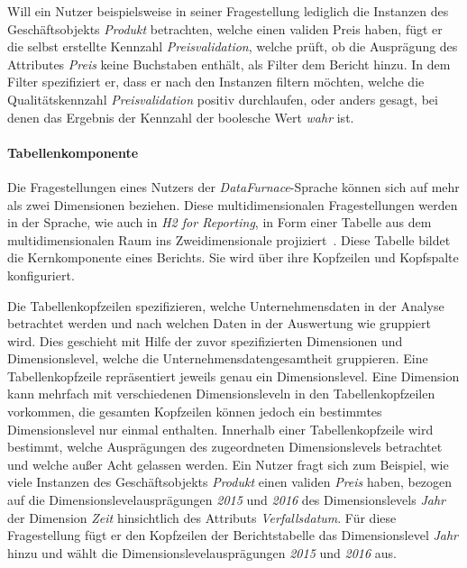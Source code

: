 \documentclass[
  language=german, %
  type=bachelor,%
  ngerman
]{isthesis}
\begin{document}
\begin{content}
  Will ein Nutzer beispielsweise in seiner Fragestellung lediglich die
  Instanzen des Geschäftsobjekts \textit{Produkt} betrachten, welche einen
  validen Preis haben, fügt er die selbst erstellte Kennzahl
  \textit{Preisvalidation}, welche prüft, ob die Ausprägung des Attributes
  \textit{Preis} keine Buchstaben enthält, als Filter dem Bericht hinzu. In dem
  Filter spezifiziert er, dass er nach den Instanzen filtern möchten, welche
  die Qualitätskennzahl \textit{Preisvalidation} positiv durchlaufen, oder
  anders gesagt, bei denen das Ergebnis der Kennzahl der boolesche Wert
  \textit{wahr} ist.

  \paragraph{Tabellenkomponente}\label{paragraph:tabellenkomponente} 
  Die Fragestellungen eines Nutzers der \textit{DataFurnace}-Sprache können
  sich auf mehr als zwei Dimensionen beziehen. Diese multidimensionalen
  Fragestellungen werden in der Sprache, wie auch in \textit{H2 for Reporting},
  in Form einer Tabelle aus dem multidimensionalen Raum ins Zweidimensionale
  projiziert~\cite[][S.  23]{becker2007h2}. Diese Tabelle bildet die
  Kernkomponente eines Berichts.  Sie wird über ihre Kopfzeilen und Kopfspalte
  konfiguriert.

  Die Tabellenkopfzeilen spezifizieren, welche Unternehmensdaten in der Analyse
  betrachtet werden und nach welchen Daten in der Auswertung wie gruppiert wird. Dies
  geschieht mit Hilfe der zuvor spezifizierten Dimensionen und Dimensionslevel,
  welche die Unternehmensdatengesamtheit gruppieren. Eine Tabellenkopfzeile
  repräsentiert jeweils genau ein Dimensionslevel. Eine Dimension kann mehrfach
  mit verschiedenen Dimensionsleveln in den Tabellenkopfzeilen vorkommen, die gesamten
  Kopfzeilen können jedoch ein bestimmtes Dimensionslevel nur einmal enthalten.
  Innerhalb einer Tabellenkopfzeile wird bestimmt, welche Ausprägungen des
  zugeordneten Dimensionslevels betrachtet und welche außer Acht gelassen
  werden. Ein Nutzer fragt sich zum Beispiel, wie viele Instanzen des
  Geschäftsobjekts \textit{Produkt} einen validen \textit{Preis} haben, bezogen
  auf die Dimensionslevelausprägungen \textit{2015} und \textit{2016} des
  Dimensionslevels \textit{Jahr} der Dimension \textit{Zeit} hinsichtlich des
  Attributs \textit{Verfallsdatum}. Für diese Fragestellung fügt er den
  Kopfzeilen der Berichtstabelle das Dimensionslevel \textit{Jahr} hinzu und
  wählt die Dimensionslevelausprägungen \textit{2015} und \textit{2016} aus.


\end{content}
\end{document}
